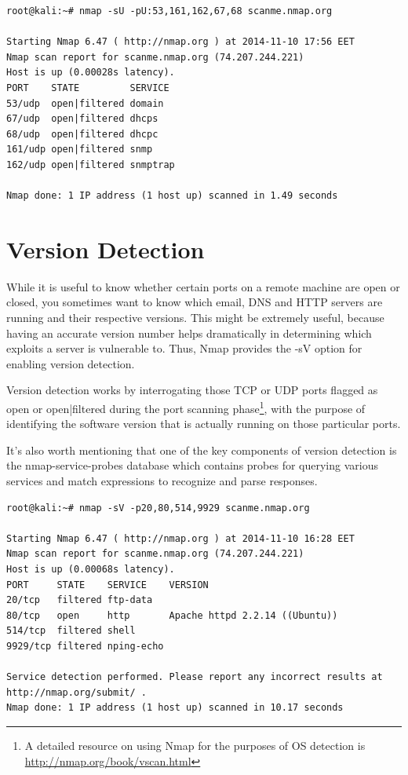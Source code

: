 \documentclass[a4paper,oneside,12pt]{book}
\begin{document}
\begin{lstlisting}[title=A sample Nmap scan using the UDP Scan option]
root@kali:~# nmap -sU -pU:53,161,162,67,68 scanme.nmap.org

Starting Nmap 6.47 ( http://nmap.org ) at 2014-11-10 17:56 EET
Nmap scan report for scanme.nmap.org (74.207.244.221)
Host is up (0.00028s latency).
PORT    STATE         SERVICE
53/udp  open|filtered domain
67/udp  open|filtered dhcps
68/udp  open|filtered dhcpc
161/udp open|filtered snmp
162/udp open|filtered snmptrap

Nmap done: 1 IP address (1 host up) scanned in 1.49 seconds
\end{lstlisting}

\chapter*{Version Detection}
 

While it is useful to know whether certain ports on a remote machine are open or closed, you sometimes want to know which email, DNS and HTTP servers are running and their respective versions. This might be extremely useful, because having an accurate version number helps dramatically in determining which exploits a server is vulnerable to. Thus, Nmap provides the -sV option for enabling version detection.

Version detection works by interrogating those TCP or UDP ports flagged as open or open|filtered during the port scanning phase\footnote{A detailed resource on using Nmap for the purposes of OS detection is \url{http://nmap.org/book/vscan.html}}, with the purpose of identifying the software version that is actually running on those particular ports.

It's also worth mentioning that one of the key components of version detection is the nmap-service-probes database which contains probes for querying various services and match expressions to recognize and parse responses.

\begin{lstlisting}[title=A sample Nmap scan using the Version Detection option]
root@kali:~# nmap -sV -p20,80,514,9929 scanme.nmap.org

Starting Nmap 6.47 ( http://nmap.org ) at 2014-11-10 16:28 EET
Nmap scan report for scanme.nmap.org (74.207.244.221)
Host is up (0.00068s latency).
PORT     STATE    SERVICE    VERSION
20/tcp   filtered ftp-data
80/tcp   open     http       Apache httpd 2.2.14 ((Ubuntu))
514/tcp  filtered shell
9929/tcp filtered nping-echo

Service detection performed. Please report any incorrect results at http://nmap.org/submit/ .
Nmap done: 1 IP address (1 host up) scanned in 10.17 seconds
\end{lstlisting}
\end{document}
